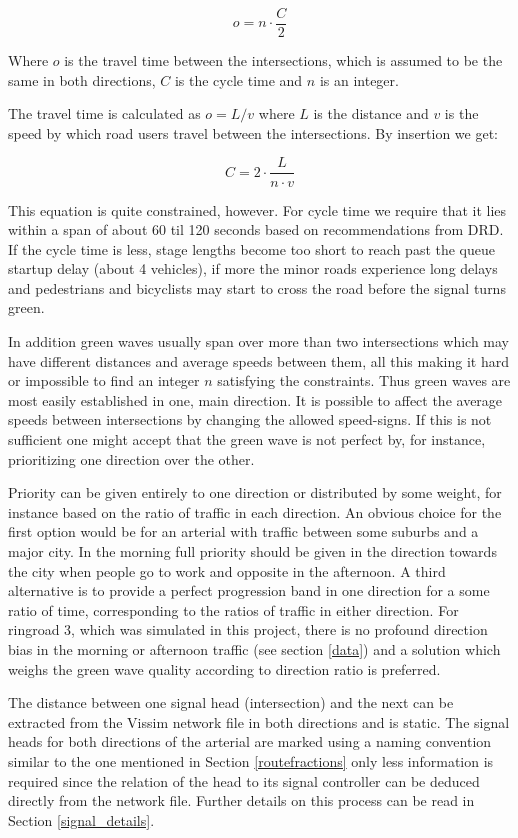 $$o = n \cdot \frac{C}{2}$$

Where $o$ is the travel time between the intersections, which is assumed to be the same in both directions, $C$ is the cycle time and $n$ is an integer.

The travel time is calculated as $o = L / v$ where $L$ is the distance and $v$ is the speed by which road users travel between the intersections. By insertion we get:

$$C = 2 \cdot \frac{L}{n \cdot v}$$

This equation is quite constrained, however. For cycle time we require that it lies within a span of about 60 til 120 seconds based on recommendations from DRD. If the cycle time is less, stage lengths become too short to reach past the queue startup delay (about 4 vehicles), if more the minor roads experience long delays and pedestrians and bicyclists may start to cross the road before the signal turns green.

In addition green waves usually span over more than two intersections which may have different distances and average speeds between them, all this making it hard or impossible to find an integer $n$ satisfying the constraints. Thus green waves are most easily established in one, main direction. It is possible to affect the average speeds between intersections by changing the allowed speed-signs. If this is not sufficient one might accept that the green wave is not perfect by, for instance, prioritizing one direction over the other.

Priority can be given entirely to one direction or distributed by some weight, for instance based on the ratio of traffic in each direction. An obvious choice for the first option would be for an arterial with traffic between some suburbs and a major city. In the morning full priority should be given in the direction towards the city when people go to work and opposite in the afternoon. A third alternative is to provide a perfect progression band in one direction for a some ratio of time, corresponding to the ratios of traffic in either direction.
For ringroad 3, which was simulated in this project, there is no profound direction bias in the morning or afternoon traffic (see section \ref{data}) and a solution which weighs the green wave quality according to direction ratio is preferred. 

The distance between one signal head (intersection) and the next can be extracted from the Vissim network file in both directions and is static. The signal heads for both directions of the arterial are marked using a naming convention similar to the one mentioned in Section \ref{routefractions} only less information is required since the relation of the head to its signal controller can be deduced directly from the network file. Further details on this process can be read in Section \ref{signal_details}.

